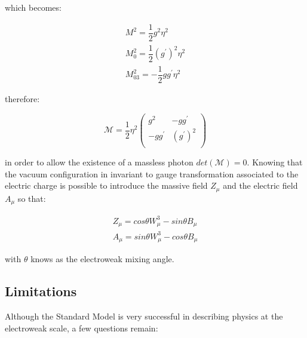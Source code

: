 which becomes:

\begin{equation}
\begin{array}{c}
M^{2}  = \dfrac{1}{2} g^{2} \eta^{2}\\
M_{0}^{2}  = \dfrac{1}{2} (g^{\prime})^{2} \eta^{2}\\
M_{03}^{2}  = -\dfrac{1}{2} gg^{\prime} \eta^{2}
\end{array}
\end{equation}

therefore:

\begin{equation}
\mathcal{M} =  \dfrac{1}{2} \eta^{2}
\begin{pmatrix}
 g^{2} & -gg^{\prime} \\
-gg^{\prime} & (g^{\prime})^{2} \\
\end{pmatrix}
\end{equation}

in order to allow the existence of a massless photon $det(\mathcal{M}) = 0$. Knowing that the vacuum configuration in invariant to gauge transformation associated to the electric charge is possible to introduce the massive field $Z_{\mu}$ and the electric field $A_{\mu}$ so that:

\begin{equation}
\begin{array}{c}
Z_{\mu} = cos\theta W^{3}_{\mu} - sin\theta B_{\mu}\\
A_{\mu} = sin\theta W^{3}_{\mu} - cos\theta B_{\mu}

\end{array}
\end{equation}

with $\theta$ knows as the electroweak mixing angle. 

\clearpage

\subsection{Limitations}


Although the Standard Model is very successful in describing physics at the electroweak scale, a few questions remain:

